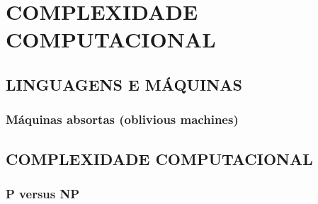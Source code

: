 \chapter{COMPLEXIDADE COMPUTACIONAL}

\section{LINGUAGENS E MÁQUINAS}

\subsection{Máquinas absortas (oblivious machines)}

\section{COMPLEXIDADE COMPUTACIONAL}

\subsection{P versus NP}
